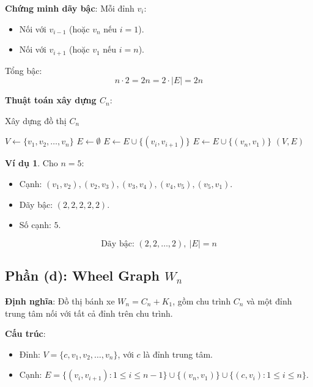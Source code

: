 \documentclass[a4paper,12pt]{article}
\theoremstyle{plain}
\theoremstyle{definition}
\newtheorem{example}{Ví dụ}
\begin{document}
\textbf{Chứng minh dãy bậc}:
Mỗi đỉnh \( v_i \):
\begin{itemize}
    \item Nối với \( v_{i-1} \) (hoặc \( v_n \) nếu \( i=1 \)).
    \item Nối với \( v_{i+1} \) (hoặc \( v_1 \) nếu \( i=n \)).
\end{itemize}
Tổng bậc:
\[
n \cdot 2 = 2n = 2 \cdot |E| = 2n
\]

\textbf{Thuật toán xây dựng \( C_n \)}:
\begin{algorithm}
\caption{Xây dựng đồ thị \( C_n \)}
\begin{algorithmic}
    \State $V \gets \{v_1, v_2, \ldots, v_n\}$
    \State $E \gets \emptyset$
        \State $E \gets E \cup \{(v_i, v_{i+1})\}$
    \EndFor
    \State $E \gets E \cup \{(v_n, v_1)\}$
    \State \Return $(V, E)$
\EndFunction
\end{algorithmic}
\end{algorithm}

\begin{example}
Cho \( n=5 \):
\begin{itemize}
    \item Cạnh: \( (v_1, v_2), (v_2, v_3), (v_3, v_4), (v_4, v_5), (v_5, v_1) \).
    \item Dãy bậc: \( (2, 2, 2, 2, 2) \).
    \item Số cạnh: \( 5 \).
\end{itemize}
\end{example}

\[
\boxed{\text{Dãy bậc: } (2, 2, \ldots, 2), \ |E| = n}
\]

\subsection*{Phần (d): Wheel Graph \( W_n \)}

\textbf{Định nghĩa}: Đồ thị bánh xe \( W_n = C_n + K_1 \), gồm chu trình \( C_n \) và một đỉnh trung tâm nối với tất cả đỉnh trên chu trình.

\textbf{Cấu trúc}:
\begin{itemize}
    \item Đỉnh: \( V = \{c, v_1, v_2, \ldots, v_n\} \), với \( c \) là đỉnh trung tâm.
    \item Cạnh: \( E = \{(v_i, v_{i+1}) : 1 \leq i \leq n-1\} \cup \{(v_n, v_1)\} \cup \{(c, v_i) : 1 \leq i \leq n\} \).
\end{itemize}
\end{document}
